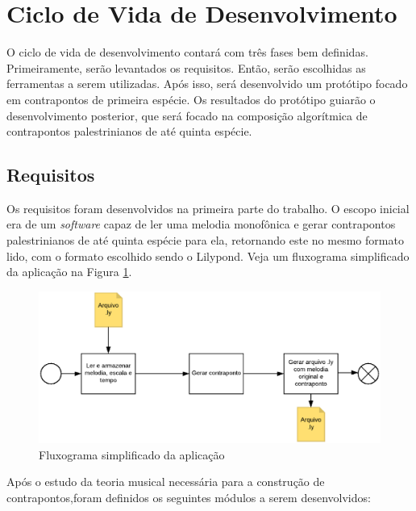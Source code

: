   \section[Ciclo de Vida de Desenvolvimento]{Ciclo de Vida de Desenvolvimento}

    O ciclo de vida de desenvolvimento contará com três fases bem definidas. Primeiramente, serão levantados os requisitos. Então, serão escolhidas as ferramentas a serem utilizadas. Após isso, será desenvolvido um protótipo focado em contrapontos de primeira espécie. Os resultados do protótipo guiarão o desenvolvimento posterior, que será focado na composição algorítmica de contrapontos palestrinianos de até quinta espécie.

  \subsection[Requisitos]{Requisitos}

    Os requisitos foram desenvolvidos na primeira parte do trabalho. O escopo inicial era de um \textit{software} capaz de ler uma melodia monofônica e gerar contrapontos palestrinianos de até quinta espécie para ela, retornando este no mesmo formato lido, com o formato escolhido sendo o Lilypond. Veja um fluxograma simplificado da aplicação na Figura \ref{fluxograma}.

    \begin{figure}[htb]
      \centering
      \includegraphics[scale=0.45]{figuras/fluxograma.eps}
      \caption{Fluxograma simplificado da aplicação}
      \label{fluxograma}
    \end{figure}


    Após o estudo da teoria musical necessária para a construção de contrapontos,foram definidos os seguintes módulos a serem desenvolvidos:

